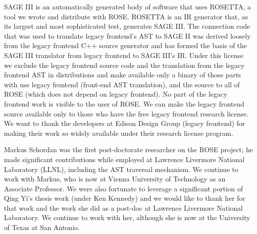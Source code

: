    SAGE III is an automatically generated body of software that uses ROSETTA, a tool we 
wrote and distribute with ROSE. ROSETTA is an IR generator that, as its largest and most
sophisticated test, generates SAGE III.  The connection code that was used to translate 
legacy frontend's AST to SAGE II was derived loosely from the legacy frontend C++ source generator and has
formed the basis of the SAGE III translator from legacy frontend to SAGE III's IR. Under this license
we exclude the legacy frontend source code and the translation from the legacy frontend AST in distributions 
and make available only a binary of those parts with use legacy frontend (front-end AST translation),
and the source to all of ROSE (which does not depend on legacy frontend). No part of the legacy frontend work is 
visible to the user of ROSE.  We can make the legacy frontend source available only to those who have 
the free legacy frontend research license.  We want to thank the developers at Edison Design Group
(legacy frontend) for making their work so widely available under their research license program.

   Markus Schordan was the first post-doctorate researcher on the ROSE project; he made 
significant contributions while employed at Lawrence Livermore National Laboratory (LLNL), 
including the AST traversal mechanism.  We continue to work with Markus, who is now at 
Vienna University of Technology as an Associate Professor. We were also fortunate to 
leverage a significant portion of Qing Yi's thesis work (under Ken Kennedy) 
and we would like to thank her for that work and the work she did as a post-doc at Lawrence Livermore National Laboratory. 
We continue to work with her, although she is now at the University of Texas at San Antonio.

